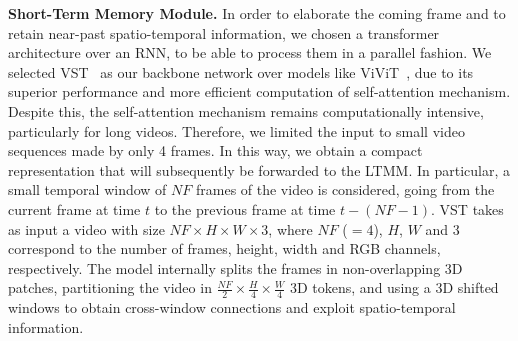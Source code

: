 \noindent\textbf{Short-Term Memory Module.}
In order to elaborate the coming frame and to retain near-past spatio-temporal information, we chosen a transformer architecture over an RNN, to be able to process them in a parallel fashion.
We selected VST~\cite{liu_video_2022} as our backbone network over models like ViViT~\cite{Arnab_2021_ICCV}, due to its superior performance and more efficient computation of self-attention mechanism.
Despite this, the self-attention mechanism remains computationally intensive, particularly for long videos. 
Therefore, we limited the input to small video sequences made by only 4 frames.
In this way, we obtain a compact representation that will subsequently be forwarded to the LTMM.
In particular, a small temporal window of $\mathit{NF}$ frames of the video is considered, going from the current frame at time $t$ to the previous frame at time $t-\left(\mathit{NF}-1\right)$.
VST takes as input a video with size $\mathit{NF} \times H \times W \times 3$, where $\mathit{NF}$ ($=4$), $H$, $W$ and $3$ correspond to the number of frames, height, width and RGB channels, respectively.
The model internally splits the frames in non-overlapping 3D patches, partitioning the video in $\frac{\mathit{NF}}{2} \times \frac{H}{4} \times \frac{W}{4}$ 3D tokens, and using a 3D shifted windows to obtain cross-window connections and exploit spatio-temporal information.

